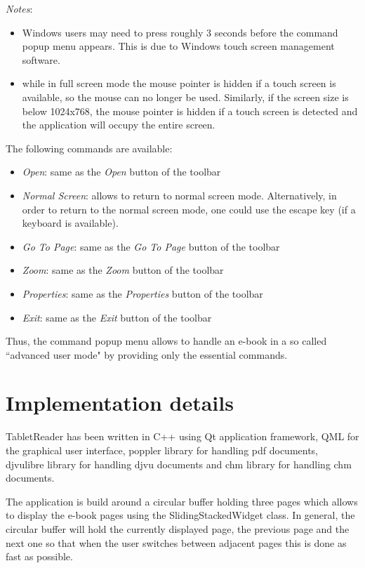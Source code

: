\documentclass[journal,12pt]{IEEEtran}
\begin{document}
\textit{Notes}: 
\begin{itemize}
 \item Windows users may need to press roughly 3 seconds before the command popup menu appears. This is due to Windows touch screen management software.
 \item while in full screen mode the mouse pointer is hidden if a touch screen is available, so the mouse can no longer be used. Similarly, if the screen size is below 1024x768, the mouse pointer is hidden if a touch screen is detected and the application will occupy the entire screen.
\end{itemize}

The following commands are available:
\begin{itemize}
 \item \textit{Open}: same as the \textit{Open} button of the toolbar
\item \textit{Normal Screen}: allows to return to normal screen mode. Alternatively, in order to return to the normal screen mode, one could use the escape key (if a keyboard is available).
 \item \textit{Go To Page}: same as the \textit{Go To Page} button of the toolbar
 \item \textit{Zoom}: same as the \textit{Zoom} button of the toolbar
 \item \textit{Properties}: same as the \textit{Properties} button of the toolbar
 \item \textit{Exit}: same as the \textit{Exit} button of the toolbar
\end{itemize}
Thus, the command popup menu allows to handle an e-book in a so called ``advanced user mode" by providing only the essential commands.

\section{Implementation details}
TabletReader has been written in C++ using Qt application framework, QML for the graphical user interface, poppler library for handling pdf documents, djvulibre library for handling djvu documents and chm library for handling chm documents. 

The application is build around a circular buffer holding three pages which allows to display the e-book pages using the \textrm{SlidingStackedWidget} class. In general, the circular buffer will hold the currently displayed page, the previous page and the next one so that when the user switches between adjacent pages this is done as fast as possible. 
\end{document}
